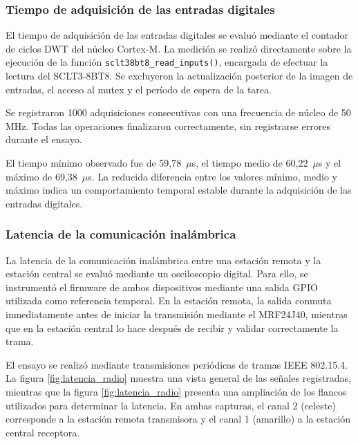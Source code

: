 \subsubsection{Tiempo de adquisición de las entradas digitales}

El tiempo de adquisición de las entradas digitales se evaluó mediante el contador de ciclos DWT del núcleo Cortex-M. La medición se realizó directamente sobre la ejecución de la función \texttt{sclt38bt8\_read\_inputs()}, encargada de efectuar la lectura del SCLT3-8BT8. Se excluyeron la actualización posterior de la imagen de entradas, el acceso al mutex y el período de espera de la tarea.

Se registraron 1000 adquisiciones consecutivas con una frecuencia de núcleo de 50 MHz. Todas las operaciones finalizaron correctamente, sin registrarse errores durante el ensayo.

El tiempo mínimo observado fue de 59,78~$\mu$s, el tiempo medio de 60,22~$\mu$s y el máximo de 69,38~$\mu$s. La reducida diferencia entre los valores mínimo, medio y máximo indica un comportamiento temporal estable durante la adquisición de las entradas digitales.

\subsubsection{Latencia de la comunicación inalámbrica}

La latencia de la comunicación inalámbrica entre una estación remota y la estación central se evaluó mediante un osciloscopio digital. Para ello, se instrumentó el firmware de ambos dispositivos mediante una salida GPIO utilizada como referencia temporal. En la estación remota, la salida conmuta inmediatamente antes de iniciar la transmisión mediante el MRF24J40, mientras que en la estación central lo hace después de recibir y validar correctamente la trama.

El ensayo se realizó mediante transmisiones periódicas de tramas IEEE 802.15.4. La figura \ref{fig:latencia_radio} muestra una vista general de las señales registradas, mientras que la figura \ref{fig:latencia_radio} presenta una ampliación de los flancos utilizados para determinar la latencia. En ambas capturas, el canal 2 (celeste) corresponde a la estación remota transmisora y el canal 1 (amarillo) a la estación central receptora.

